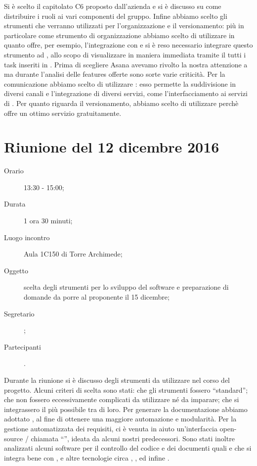 Si è scelto il capitolato C6 \proj{} proposto dall'azienda \ZU{} e si è discusso su come distribuire i ruoli ai vari componenti del gruppo.
Infine abbiamo scelto gli strumenti che verranno utilizzati per l'organizzazione e il versionamento: più in particolare come strumento di organizzazione abbiamo scelto di utilizzare  in quanto offre, per esempio, l'integrazione con  e si è reso necessario integrare questo strumento ad , allo scopo di visualizzare in maniera immediata tramite il  tutti i task inseriti in . Prima di scegliere Asana avevamo rivolto la nostra attenzione a  ma durante l'analisi delle features offerte sono sorte varie criticità. Per la comunicazione abbiamo scelto di utilizzare : esso permette la suddivisione in diversi canali e l'integrazione di diversi servizi, come l'interfacciamento ai servizi di . Per quanto riguarda il versionamento, abbiamo scelto di utilizzare   perchè offre un ottimo servizio gratuitamente.



\section{Riunione del 12 dicembre 2016}

\begin{description}
	\item[Orario] 13:30 - 15:00;
	\item[Durata] 1 ora 30 minuti;
	\item[Luogo incontro] Aula 1C150 di Torre Archimede; 
	\item[Oggetto] scelta degli strumenti per lo sviluppo del software e preparazione di domande da porre al proponente il 15 dicembre;
	\item[Segretario] \PB; 
	\item[Partecipanti] \ALL.
\end{description}

Durante la riunione si è discusso degli strumenti da utilizzare nel corso del progetto. Alcuni criteri di scelta sono stati: che gli strumenti fossero “standard”; che non fossero eccessivamente complicati da utilizzare né da imparare; che si integrassero il più possibile tra di loro. Per generare la documentazione abbiamo adottato , al fine di ottenere una maggiore automazione e modularità. Per la gestione automatizzata dei requisiti, ci è venuta in aiuto un'interfaccia open-source / chiamata “”, ideata da alcuni nostri predecessori. Sono stati inoltre analizzati alcuni software per il controllo del codice e dei documenti quali  e  che si integra bene con , e altre tecnologie circa , ,  ed infine .

